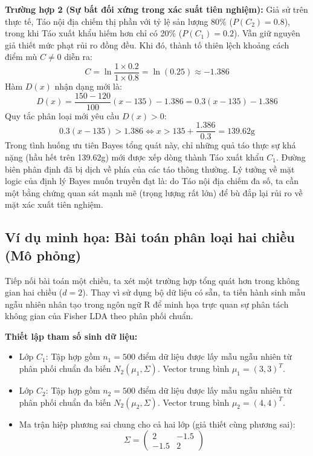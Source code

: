 \textbf{Trường hợp 2 (Sự bất đối xứng trong xác suất tiên nghiệm):} 
Giả sử trên thực tế, Táo nội địa chiếm thị phần với tỷ lệ sản lượng 80\% ($P(C_2) = 0.8$), trong khi Táo xuất khẩu hiếm hơn chỉ có 20\% ($P(C_1) = 0.2$). Vẫn giữ nguyên giả thiết mức phạt rủi ro đồng đều.
Khi đó, thành tố thiên lệch khoảng cách điểm mù $C \neq 0$ diễn ra:
\begin{equation}
    C = \ln \frac{1 \times 0.2}{1 \times 0.8} = \ln(0.25) \approx -1.386
\end{equation}
Hàm $D(x)$ nhận dạng mới là:
\begin{equation}
    D(x) = \frac{150 - 120}{100} (x - 135) - 1.386 = 0.3(x - 135) - 1.386 
\end{equation}
Quy tắc phân loại mới yêu cầu $D(x) > 0$:
\begin{equation}
    0.3(x - 135) > 1.386 \iff x > 135 + \frac{1.386}{0.3} = 139.62 \text{g}
\end{equation}
Trong tình huống ưu tiên Bayes tổng quát này, chỉ những quả táo thực sự khá nặng (hầu hết trên 139.62g) mới được xếp dòng thành Táo xuất khẩu $C_1$. Đường biên phân định đã bị dịch về phía của các táo thông thường. Lý tưởng về mặt logic của định lý Bayes muốn truyền đạt là: do Táo nội địa chiếm đa số, ta cần một bằng chứng quan sát mạnh mẽ (trọng lượng rất lớn) để bù đắp lại rủi ro về mặt xác xuất tiên nghiệm.

\subsection{Ví dụ minh họa: Bài toán phân loại hai chiều (Mô phỏng)}

Tiếp nối bài toán một chiều, ta xét một trường hợp tổng quát hơn trong không gian hai chiều ($d=2$). Thay vì sử dụng bộ dữ liệu có sẵn, ta tiến hành sinh mẫu ngẫu nhiên nhân tạo trong ngôn ngữ R để minh họa trực quan sự phân tách không gian của Fisher LDA theo phân phối chuẩn. 

\textbf{Thiết lập tham số sinh dữ liệu:}
\begin{itemize}
    \item Lớp $C_1$: Tập hợp gồm $n_1 = 500$ điểm dữ liệu được lấy mẫu ngẫu nhiên từ phân phối chuẩn đa biến $N_2(\mu_1, \Sigma)$. Vector trung bình $\mu_1 = (3, 3)^T$.
    \item Lớp $C_2$: Tập hợp gồm $n_2 = 500$ điểm dữ liệu được lấy mẫu ngẫu nhiên từ phân phối chuẩn đa biến $N_2(\mu_2, \Sigma)$. Vector trung bình $\mu_2 = (4, 4)^T$.
    \item Ma trận hiệp phương sai chung cho cả hai lớp (giả thiết cùng phương sai): 
    $$ \Sigma = \begin{pmatrix} 2 & -1.5 \\ -1.5 & 2 \end{pmatrix} $$
\end{itemize}

